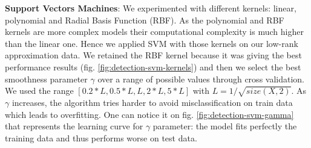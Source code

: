 \documentclass{article}
\begin{document}
  \textbf{Support Vectors Machines}: We experimented with different kernels: linear, polynomial and Radial Basis Function (RBF). As the polynomial and RBF kernels are more complex models their computational complexity is much higher than the linear one. Hence we applied SVM with those kernels on our low-rank approximation data. We retained the RBF kernel because it was giving the best performance results (fig. \ref{fig:detection-svm-kernels}) and then we select the best smoothness parameter $\gamma$ over a range of possible values through cross validation. We used the range $[0.2*L, 0.5*L, L, 2*L, 5*L]$ with $L = 1 / \sqrt{size(X,2)}$. As $\gamma$ increases, the algorithm tries harder to avoid misclassification on train data which leads to overfitting. One can notice it on fig. \ref{fig:detection-svm-gamma} that represents the learning curve for $\gamma$ parameter: the model fits perfectly the training data and thus performs worse on test data.
\end{document}
